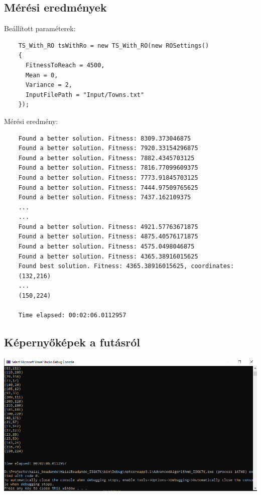 \documentclass{article}
\begin{document}
  \subsection{Mérési eredmények}
  Beállított paraméterek:
  \begin{lstlisting}
    TS_With_RO tsWithRo = new TS_With_RO(new ROSettings()
    {
      FitnessToReach = 4500,
      Mean = 0,
      Variance = 2,
      InputFilePath = "Input/Towns.txt"
    });
  \end{lstlisting}
  Mérési eredmény:
  \begin{lstlisting}
    Found a better solution. Fitness: 8309.373046875
    Found a better solution. Fitness: 7920.33154296875
    Found a better solution. Fitness: 7882.4345703125
    Found a better solution. Fitness: 7816.77099609375
    Found a better solution. Fitness: 7773.91845703125
    Found a better solution. Fitness: 7444.97509765625
    Found a better solution. Fitness: 7437.162109375
    ...
    ...
    Found a better solution. Fitness: 4921.57763671875
    Found a better solution. Fitness: 4875.40576171875
    Found a better solution. Fitness: 4575.0498046875
    Found a better solution. Fitness: 4365.38916015625
    Found best solution. Fitness: 4365.38916015625, coordinates:
    (132,216)
    ...
    (150,224)

    Time elapsed: 00:02:06.0112957
  \end{lstlisting}
  \subsection{Képernyőképek a futásról}
  \includegraphics[width=1.0\textwidth]{random}
\end{document}
